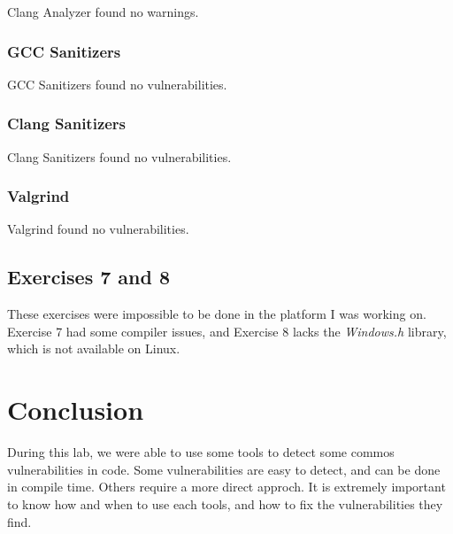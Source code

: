 \documentclass{article}
\begin{document}
Clang Analyzer found no warnings.

\subsubsection{GCC Sanitizers}

GCC Sanitizers found no vulnerabilities.

\subsubsection{Clang Sanitizers}

Clang Sanitizers found no vulnerabilities.

\subsubsection{Valgrind}

Valgrind found no vulnerabilities.

\subsection{Exercises 7 and 8}

These exercises were impossible to be done in the platform I was working on. Exercise 7 had some compiler issues, and Exercise 8 lacks the \textit{Windows.h} library, which is not available on Linux.

\section{Conclusion}

During this lab, we were able to use some tools to detect some commos vulnerabilities in code. Some vulnerabilities are easy to detect, and can be done in compile time. Others require a more direct approch. It is extremely important to know how and when to use each tools, and how to fix the vulnerabilities they find.
\end{document}
